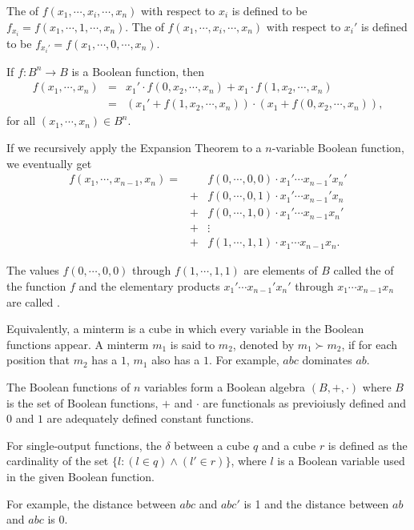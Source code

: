 \documentclass{myproc}
\begin{document}
\begin{definition}
The  of $f(x_1, \cdots, x_i, \cdots, x_n)$ with respect to
$x_i$ is defined to be $f_{x_i} = f(x_1, \cdots, 1, \cdots, x_n)$.
The  of $f(x_1, \cdots, x_i, \cdots, x_n)$ with respect to
$x_i'$ is defined to be $f_{x_i'} = f(x_1, \cdots, 0, \cdots, x_n)$.
\end{definition}

\begin{theorem}
If $f: B^n \rightarrow B$ is a Boolean function, then
\begin{eqnarray*}
f(x_1,\cdots, x_n) & = &
	x_1'\cdot{}f(0, x_2, \cdots, x_n) +
	x_1\cdot{}f(1,x_2,\cdots,x_n) \\
	& = &
	(x_1' + f(1, x_2, \cdots, x_n))\cdot(x_1 + f(0, x_2, \cdots, x_n)),
\end{eqnarray*}
for all $(x_1, \cdots, x_n) \in B^n$.
\end{theorem}
If we recursively apply the Expansion Theorem to a $n$-variable
Boolean function, we eventually get
\begin{eqnarray*}
f(x_1, \cdots, x_{n-1}, x_n) = &  &
	f(0, \cdots, 0, 0)\cdot{}x_1'\cdots{}x_{n-1}'x_n' \\
	&+&  f(0, \cdots, 0, 1)\cdot{}x_1'\cdots{}x_{n-1}'x_n \\
	&+&  f(0, \cdots, 1, 0)\cdot{}x_1'\cdots{}x_{n-1}x_n' \\
	&+& \vdots \\
	&+&  f(1, \cdots, 1, 1)\cdot{}x_1\cdots{}x_{n-1}x_n.
\end{eqnarray*}
\begin{definition}
The values $f(0, \cdots, 0, 0)$ through $f(1, \cdots, 1, 1)$
are elements of $B$ called the  of the function $f$
and the elementary products $x_1'\cdots{}x_{n-1}'x_n'$ through
$x_1\cdots{}x_{n-1}x_n$ are called .
\end{definition}
Equivalently, a minterm is a cube in which every variable in the
Boolean functions appear.
A minterm $m_1$ is said to  $m_2$, denoted by
$m_1 \succ m_2$, if for each position that $m_2$ has a $1$, $m_1$ also
has a $1$.
For example, $abc$ dominates $ab$.

The Boolean functions of $n$ variables form a Boolean algebra
$(B, +, \cdot)$ where $B$ is the set of Boolean functions,
$+$ and $\cdot$ are functionals as previoiusly defined and 
$0$ and $1$ are adequately defined constant functions.

\begin{definition}
For single-output functions, the  $\delta$
between a cube $q$ and a cube $r$ is defined as the cardinality
of the set $\{l : (l \in q) \wedge (l' \in r)\}$, where $l$
is a Boolean variable used in the given Boolean function.
\end{definition}
For example, the distance between $abc$ and $abc'$ is 1 and the
distance between $ab$ and $abc$ is $0$.
\end{document}
